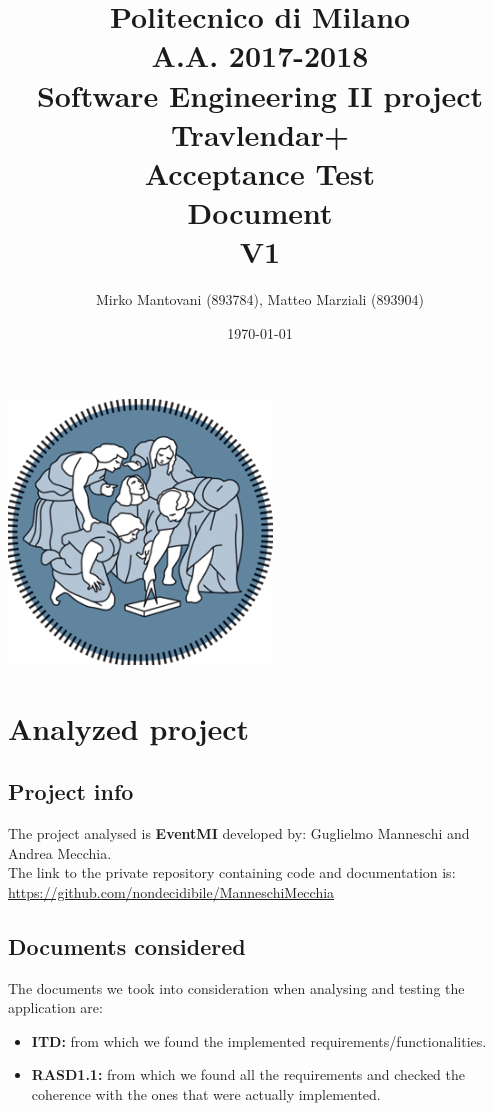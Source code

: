 \documentclass{article}
\author{Mirko Mantovani (893784), Matteo Marziali (893904)}
\date{\today}
\title{Politecnico di Milano
	\\A.A. 2017\@-\@2018
	\\Software Engineering II project \\ \textbf{Travlendar+}
	\\
	\textbf{A}cceptance \textbf{T}est 
	\\ \textbf{D}ocument 
	\\
	\textbf{V1}}
\begin{document}
\maketitle
\begin{center}
	\includegraphics[width=7cm]{polimi-logo}
\end{center}
\clearpage
{\hypersetup{hidelinks}\tableofcontents}


\clearpage
\section{Analyzed project}
\subsection{Project info}
The project analysed is \textbf{EventMI} developed by: Guglielmo Manneschi and Andrea Mecchia.
\\The link to the private repository containing code and documentation is: \\
\href{url}{https://github.com/nondecidibile/ManneschiMecchia}

\subsection{Documents considered}
The documents we took into consideration when analysing and testing the application are:
\begin{itemize}
\item \textbf{ITD:} from which we found the implemented requirements/functionalities.
\item \textbf{RASD1.1:} from which we found all the requirements and checked the coherence with the ones that were actually implemented.

\end{itemize}
\end{document}
